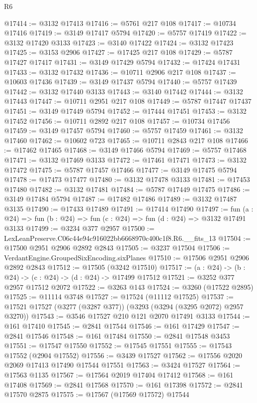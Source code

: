 \begin{lexlean}{R6}
\begin{coremodule}
@17414 := @3132 @17413
@17416 := @5761 @217 @108
@17417 := @10734 @17416
@17419 := @3149 @17417 @5794
@17420 := @5757 @17419
@17422 := @3132 @17420 @3133
@17423 := @3140 @17422
@17424 := @3132 @17423
@17425 := @3153 @2906
@17427 := @17425 @217 @108
@17429 := @5787 @17427 @17417
@17431 := @3149 @17429 @5794
@17432 := @17424 @17431
@17433 := @3132 @17432
@17436 := @10711 @2906 @217 @108
@17437 := @10603 @17436
@17439 := @3149 @17437 @5794
@17440 := @5757 @17439
@17442 := @3132 @17440 @3133
@17443 := @3140 @17442
@17444 := @3132 @17443
@17447 := @10711 @2951 @217 @108
@17449 := @5787 @17447 @17437
@17451 := @3149 @17449 @5794
@17452 := @17444 @17451
@17453 := @3132 @17452
@17456 := @10711 @2892 @217 @108
@17457 := @10734 @17456
@17459 := @3149 @17457 @5794
@17460 := @5757 @17459
@17461 := @3132 @17460
@17462 := @10602 @723
@17465 := @10711 @2843 @217 @108
@17466 := @17462 @17465
@17468 := @3149 @17466 @5794
@17469 := @5757 @17468
@17471 := @3132 @17469 @3133
@17472 := @17461 @17471
@17473 := @3132 @17472
@17475 := @5787 @17457 @17466
@17477 := @3149 @17475 @5794
@17478 := @17473 @17477
@17480 := @3132 @17478 @3133
@17481 := @17453 @17480
@17482 := @3132 @17481
@17484 := @5787 @17449 @17475
@17486 := @3149 @17484 @5794
@17487 := @17482 @17486
@17489 := @3132 @17487 @3135
@17490 := @17433 @17489
@17491 := @17414 @17490
@17497 := fun (a : @24) => fun (b : @24) => fun (c : @24) => fun (d : @24) => @3132 @17491 @3133
@17499 := @3234 @377 @2957
@17500 := LexLeanPreserve.C06c44e94c916022bb6668970c400c1f8.R6.__fits_13
@17504 := @17500 @2951 @2906 @2892 @2843
@17505 := @3237 @17504
@17506 := VerdantEngine.GroupedSixEncoding.sixPlanes
@17510 := @17506 @2951 @2906 @2892 @2843
@17512 := @17505 (@3242 @17510)
@17517 := (a : @24) -> (b : @24) -> (c : @24) -> (d : @24) -> @17499 @17512
@17521 := @3252 @377 @2957 @17512 @2072
@17522 := @3263 @143
@17524 := @3260 (@17522 @2895)
@17525 := @11114 @3748
@17527 := @17524 (@11112 @17525)
@17537 := @17521 @17527 (@3277 (@3287 @377)) (@3293 (@3294 (@3295 @2072) @2957 @3270))
@17543 := @3546 @17527 @210 @121 @2070 @17491 @3133
@17544 := @161 @17410
@17545 := @2841 @17544
@17546 := @161 @17429
@17547 := @2841 @17546
@17548 := @161 @17484
@17550 := @2841 @17548 @3453
@17551 := @17547 @17550
@17552 := @17545 @17551
@17555 := @17543 @17552 (@2904 @17552)
@17556 := @3439 @17527
@17562 := @17556 @2020 @2069 @17413 @17490 @17544 @17551
@17563 := @3424 @17527
@17564 := @17563 @1135
@17567 := @17564 @2019 @17404 @17412
@17568 := @161 @17408
@17569 := @2841 @17568
@17570 := @161 @17398
@17572 := @2841 @17570 @2875
@17575 := @17567 (@17569 @17572) @17544

\end{coremodule}
\end{lexlean}
